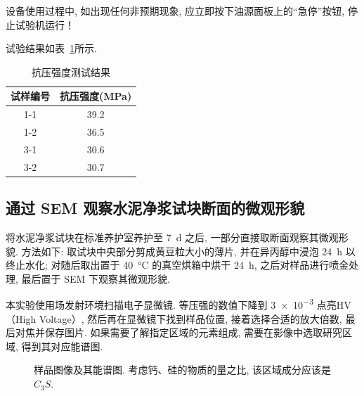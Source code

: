 设备使用过程中, 如出现任何非预期现象, 应立即按下油源面板上的“急停”按钮, 停止试验机运行！

试验结果如表~\ref{tbl:compressive_strength_test}所示.

\begin{table}[!t]
    \centering
    \caption{抗压强度测试结果}
    \begin{tabular}{|c|c|}
    \hline
    试样编号 & 抗压强度(MPa) \\ \hline
    1-1  & 39.2      \\ \hline
    1-2  & 36.5      \\ \hline
    3-1  & 30.6      \\ \hline
    3-2  & 30.7      \\ \hline
    \end{tabular}
    \label{tbl:compressive_strength_test}
\end{table}

\subsection{通过 SEM 观察水泥净浆试块断面的微观形貌}

将水泥净浆试块在标准养护室养护至 \SI{7}{\day} 之后, 一部分直接取断面观察其微观形貌.
方法如下: 取试块中央部分剪成黄豆粒大小的薄片, 并在异丙醇中浸泡 \SI{24}{\hour} 以终止水化; 对随后取出置于 \SI{40}{\degreeCelsius} 的真空烘箱中烘干 \SI{24}{\hour}, 之后对样品进行喷金处理, 最后置于 SEM 下观察其微观形貌. 

本实验使用场发射环境扫描电子显微镜. 等压强的数值下降到 \num{3e-3} 点亮HV（High Voltage）, 然后再在显微镜下找到样品位置, 接着选择合适的放大倍数, 最后对焦并保存图片. 
如果需要了解指定区域的元素组成, 需要在影像中选取研究区域, 得到其对应能谱图.

\begin{figure}
    \centering
     \quad
    \caption{样品图像及其能谱图. 考虑钙、硅的物质的量之比, 该区域成分应该是$C_3 S$.}
\end{figure}


